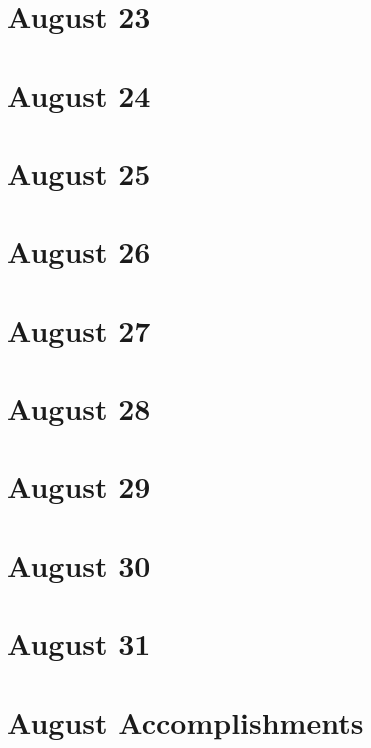 \section{August 23}

\section{August 24}

\section{August 25}

\section{August 26}

\section{August 27}

\section{August 28}

\section{August 29}

\section{August 30}

\section{August 31}

\section*{August Accomplishments}

